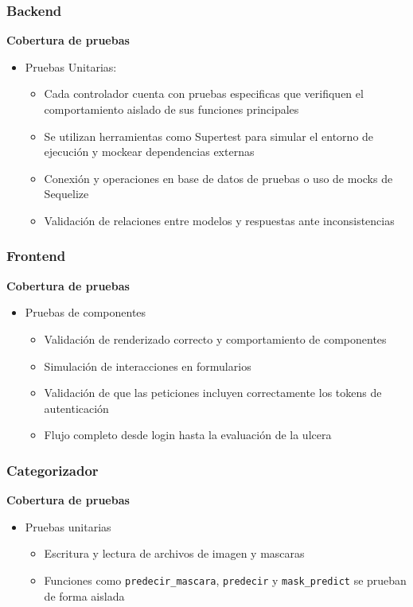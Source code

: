 \subsubsection{Backend}
\textbf{Cobertura de pruebas}
\begin{itemize}
    \item Pruebas Unitarias:
    \begin{itemize}
        \item Cada controlador cuenta con pruebas especificas que verifiquen el comportamiento aislado de sus funciones principales
    \end{itemize}
\begin{itemize}
    \item Se utilizan herramientas como Supertest para simular el entorno de ejecución y mockear dependencias externas
    \item Conexión y operaciones en base de datos de pruebas o uso de mocks de Sequelize
    \item Validación de relaciones entre modelos y respuestas ante inconsistencias
\end{itemize}
\end{itemize}

\subsubsection{Frontend}
\textbf{Cobertura de pruebas}
\begin{itemize}
    \item Pruebas de componentes
    \begin{itemize}
        \item Validación de renderizado correcto y comportamiento de componentes
    \end{itemize}
\begin{itemize}
    \item Simulación de interacciones en formularios
\end{itemize}
\begin{itemize}
    \item Validación de que las peticiones incluyen correctamente los tokens de autenticación
    \item Flujo completo desde login hasta la evaluación de la ulcera
\end{itemize}
\end{itemize}
\subsubsection{Categorizador}
\textbf{Cobertura de pruebas}
\begin{itemize}
    \item Pruebas unitarias
    \begin{itemize}
        \item Escritura y lectura de archivos de imagen y mascaras
        \item Funciones como \texttt{predecir\_mascara}, \texttt{predecir} y \texttt{mask\_predict} se prueban de forma aislada
    \end{itemize}
\end{itemize}

